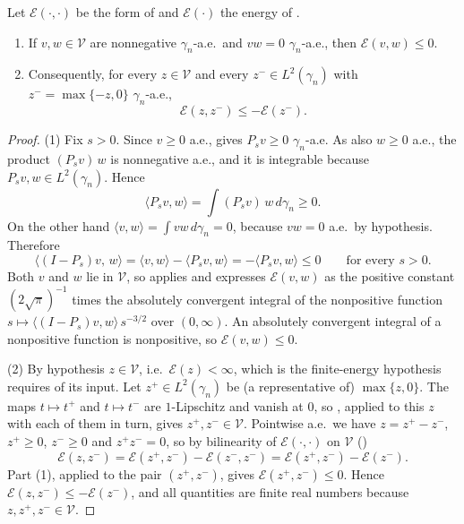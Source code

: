 \begin{lemma}
Let $\mathcal{E}(\cdot,\cdot)$ be the form of  and
$\mathcal{E}(\cdot)$ the energy of .
\begin{enumerate}
\item If $v, w \in \mathcal{V}$ are nonnegative $\gamma_n$-a.e.\ and
$vw = 0$ $\gamma_n$-a.e., then $\mathcal{E}(v,w) \leq 0$.
\item Consequently, for every $z \in \mathcal{V}$ and every
$z^- \in L^2(\gamma_n)$ with $z^- = \max\{-z, 0\}$ $\gamma_n$-a.e.,
\[
  \mathcal{E}(z, z^-) \leq -\mathcal{E}(z^-) .
\]
\end{enumerate}
\end{lemma}
\begin{proof}
(1)  Fix $s > 0$.  Since $v \geq 0$ a.e.,  gives
$P_s v \geq 0$ $\gamma_n$-a.e.  As also $w \geq 0$ a.e., the product
$(P_s v)\, w$ is nonnegative a.e., and it is integrable because
$P_s v, w \in L^2(\gamma_n)$.  Hence
\[
  \langle P_s v, w\rangle = \int (P_s v)\, w \, d\gamma_n \geq 0 .
\]
On the other hand $\langle v, w\rangle = \int v w \, d\gamma_n = 0$, because
$vw = 0$ a.e.\ by hypothesis.  Therefore
\[
  \bigl\langle (I - P_s)v,\, w\bigr\rangle
    = \langle v, w\rangle - \langle P_s v, w\rangle
    = -\langle P_s v, w\rangle \leq 0
  \qquad\text{for every } s > 0 .
\]
Both $v$ and $w$ lie in $\mathcal{V}$, so  applies
and expresses $\mathcal{E}(v,w)$ as the positive constant
$(2\sqrt\pi)^{-1}$ times the absolutely convergent integral of the nonpositive
function $s \mapsto \langle (I-P_s)v, w\rangle\, s^{-3/2}$ over $(0,\infty)$.  An
absolutely convergent integral of a nonpositive function is nonpositive, so
$\mathcal{E}(v,w) \leq 0$.

(2)  By hypothesis $z \in \mathcal{V}$, i.e.\ $\mathcal{E}(z) < \infty$, which is
the finite-energy hypothesis  requires of its input.
Let $z^+ \in L^2(\gamma_n)$ be (a representative of) $\max\{z,0\}$.  The maps
$t \mapsto t^+$ and $t \mapsto t^-$ are $1$-Lipschitz and vanish at $0$, so
, applied to this $z$ with each of them in turn,
gives $z^+, z^- \in \mathcal{V}$.  Pointwise a.e.\ we
have $z = z^+ - z^-$, $z^+ \geq 0$, $z^- \geq 0$ and $z^+ z^- = 0$, so by
bilinearity of $\mathcal{E}(\cdot,\cdot)$ on $\mathcal{V}$ ()
\[
  \mathcal{E}(z, z^-) = \mathcal{E}(z^+, z^-) - \mathcal{E}(z^-, z^-)
    = \mathcal{E}(z^+, z^-) - \mathcal{E}(z^-) .
\]
Part (1), applied to the pair $(z^+, z^-)$, gives
$\mathcal{E}(z^+, z^-) \leq 0$.  Hence
$\mathcal{E}(z, z^-) \leq -\mathcal{E}(z^-)$, and all quantities are finite real
numbers because $z, z^+, z^- \in \mathcal{V}$.
\end{proof}
